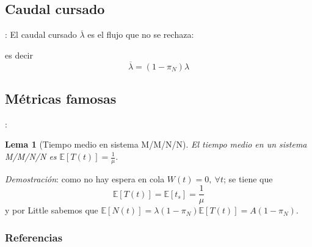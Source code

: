 \documentclass[xcolor={x11names}]{beamer}
\newtheorem{lema}{Lema}[section]
\begin{document}
\subsection{Caudal cursado}
\begin{frame}{\secname: \subsecname}
    El caudal cursado $\overline{\lambda}$
    es el flujo que no se rechaza:
    \begin{figure}
        \resizebox{!}{.3\textwidth}{%
            
        }
    \end{figure}
    es decir
    \begin{equation*}
        \overline{\lambda}=
        (1-\pi_N)\lambda
    \end{equation*}
\end{frame}



\subsection{Métricas famosas}
\begin{frame}{\secname: \subsecname}
    \begin{lema}[Tiempo medio en sistema
        M/M/N/N]
        El tiempo medio en un sistema
        M/M/N/N es
        $\mathbb{E}[T(t)]=\frac{1}{\mu}$.
    \end{lema}
    
    \begin{figure}
        \resizebox{!}{.2\textwidth}{%
            
        }
    \end{figure}

    \textit{Demostración}: como no
    hay espera en cola $W(t)=0,\ \forall t$;
    se tiene que
    \begin{equation*}
        \mathbb{E}[T(t)]=\mathbb{E}[t_s]
        =\frac{1}{\mu}
    \end{equation*}
    y por Little sabemos
    que $\mathbb{E}[N(t)]=\lambda(1-\pi_N)\mathbb{E}[T(t)]=A(1-\pi_N)$.
\end{frame}

\begin{frame}
    \begin{figure}
        
    \end{figure}
\end{frame}


\begin{frame}[allowframebreaks]
        \nocite{amable}
        \frametitle{Referencias}
        
        
\end{frame}
\end{document}
